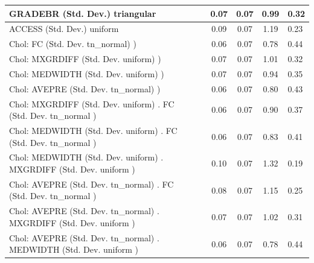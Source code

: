 \begin{table}
\begin{center}
\begin{tabular}{|l|l|c|c|c|l|}
			\hline
			GRADEBR (Std. Dev.) triangular &  & 0.07 & 0.07 & 0.99 & 0.32 \\
			\hline
			ACCESS (Std. Dev.) uniform &  & 0.09 & 0.07 & 1.19 & 0.23 \\
			\hline
			 Chol: FC (Std. Dev. tn_normal) ) &  & 0.06 & 0.07 & 0.78 & 0.44 \\
			\hline
			 Chol: MXGRDIFF (Std. Dev. uniform) ) &  & 0.07 & 0.07 & 1.01 & 0.32 \\
			\hline
			 Chol: MEDWIDTH (Std. Dev. uniform) ) &  & 0.07 & 0.07 & 0.94 & 0.35 \\
			\hline
			 Chol: AVEPRE (Std. Dev. tn_normal) ) &  & 0.06 & 0.07 & 0.80 & 0.43 \\
			\hline
			 Chol: MXGRDIFF (Std. Dev. uniform) . FC (Std. Dev.   tn_normal ) &  & 0.06 & 0.07 & 0.90 & 0.37 \\
			\hline
			 Chol: MEDWIDTH (Std. Dev. uniform) . FC (Std. Dev.   tn_normal ) &  & 0.06 & 0.07 & 0.83 & 0.41 \\
			\hline
			 Chol: MEDWIDTH (Std. Dev. uniform) . MXGRDIFF (Std. Dev.   uniform ) &  & 0.10 & 0.07 & 1.32 & 0.19 \\
			\hline
			 Chol: AVEPRE (Std. Dev. tn_normal) . FC (Std. Dev.   tn_normal ) &  & 0.08 & 0.07 & 1.15 & 0.25 \\
			\hline
			 Chol: AVEPRE (Std. Dev. tn_normal) . MXGRDIFF (Std. Dev.   uniform ) &  & 0.07 & 0.07 & 1.02 & 0.31 \\
			\hline
			 Chol: AVEPRE (Std. Dev. tn_normal) . MEDWIDTH (Std. Dev.   uniform ) &  & 0.06 & 0.07 & 0.78 & 0.44 \\
			\hline
		\end{tabular}
	\end{center}
\end{table}